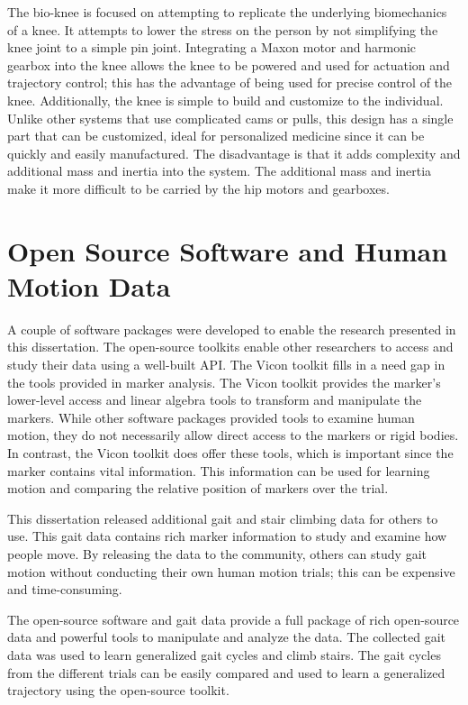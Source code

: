 The bio-knee is focused on attempting to replicate the underlying biomechanics of a knee. It attempts to lower the stress on the person by not simplifying the knee joint to a simple pin joint. Integrating a Maxon motor and harmonic gearbox into the knee allows the knee to be powered and used for actuation and trajectory control; this has the advantage of being used for precise control of the knee. Additionally, the knee is simple to build and customize to the individual. Unlike other systems that use complicated cams or pulls, this design has a single part that can be customized, ideal for personalized medicine since it can be quickly and easily manufactured. The disadvantage is that it adds complexity and additional mass and inertia into the system. The additional mass and inertia make it more difficult to be carried by the hip motors and gearboxes.



\section{Open Source Software and Human Motion Data}

A couple of software packages were developed to enable the research presented in this dissertation. The open-source toolkits enable other researchers to access and study their data using a well-built API. The Vicon toolkit fills in a need gap in the tools provided in marker analysis. The Vicon toolkit provides the marker's lower-level access and linear algebra tools to transform and manipulate the markers. While other software packages provided tools to examine human motion, they do not necessarily allow direct access to the markers or rigid bodies. In contrast, the Vicon toolkit does offer these tools, which is important since the marker contains vital information. This information can be used for learning motion and comparing the relative position of markers over the trial. 

This dissertation released additional gait and stair climbing data for others to use. This gait data contains rich marker information to study and examine how people move. By releasing the data to the community, others can study gait motion without conducting their own human motion trials; this can be expensive and time-consuming. 

The open-source software and gait data provide a full package of rich open-source data and powerful tools to manipulate and analyze the data. The collected gait data was used to learn generalized gait cycles and climb stairs. The gait cycles from the different trials can be easily compared and used to learn a generalized trajectory using the open-source toolkit. 



